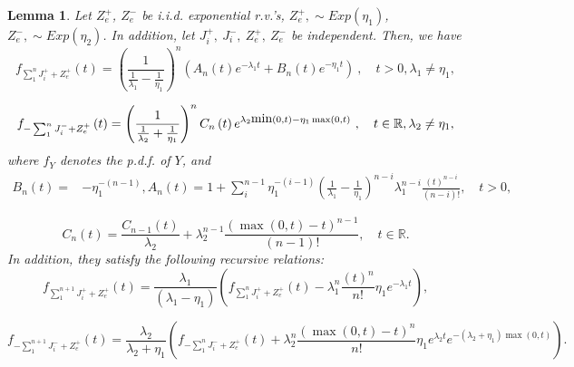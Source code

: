 \documentclass[11pt]{article}
\newtheorem{lemma}[theorem]{Lemma}
\numberwithin{equation}{section}
\numberwithin{theorem}{section}
\def\R{\mathbb{R}}
\begin{document}
\begin{lemma}
Let $Z_{e}^{+}$, $Z_{e}^{-}$ be i.i.d. exponential r.v.'s, $Z_{e}^{+},\sim Exp(\eta_{1})$,
$Z_{e}^{-},\sim Exp(\eta_{2})$. In addition, let $J_{i}^{+},\ J_{i}^{-},\ Z_{e}^{+},\ Z_{e}^{-}$
be independent. Then,  we have
\begin{equation}
f_{\sum_{1}^{n}J_{i}^{+}+Z_{e}^{+}}\left(t\right)=\left(\frac{1}{\frac{1}{\lambda_{1}}-\frac{1}{\eta_{1}}}\right)^{n}\left(A_{n}\left(t\right)e^{-\lambda_{1}t}+B_{n}\left(t\right)e^{-\eta_{1}t}\right)\ ,\quad t>0,  \lambda_{1}\neq\eta_{1},\label{eq:f_++}
\end{equation}
 
\begin{equation}
f_{-\sum_{1}^{n}J_{i}^{-}+Z_{e}^{+}}\left(t\right)=\left(\frac{1}{\frac{1}{\lambda_{2}}+\frac{1}{\eta_{1}}}\right)^{n}C_{n}\left(t\right)e^{\lambda_{2}\hbox{min}\left(0,t\right)-\eta_{1}\max\left(0,t\right)}\ ,\quad t\in \R,  \lambda_{2}\neq\eta_{1},\label{eq:f_-+}
\end{equation}
 where $f_{Y}$ denotes the p.d.f.  of $Y$, and 
\begin{align*}
B_{n}\left(t\right)= & -\eta_{1}^{-\left(n-1\right)},A_{n}\left(t\right)=1+\sum_{i}^{n-1}\eta_{1}^{-\left(i-1\right)}\left(\frac{1}{\lambda_{1}}-\frac{1}{\eta_{1}}\right)^{n-i}\lambda_{1}^{n-i}\frac{\left(t\right)^{n-i}}{\left(n-i\right)!}, \quad t >0,
\end{align*}
  
\[
C_{n}\left(t\right)=\frac{C_{n-1}\left(t\right)}{\lambda_{2}}+\lambda_{2}^{n-1}\frac{\left({\max}\left(0,t\right)-t\right)^{n-1}}{(n-1)!}, \quad t\in \R.
\]
 In addition, they  satisfy the following recursive relations: 
\begin{equation}
f_{\sum_{1}^{n+1}J_{i}^{+}+Z_{e}^{+}}\left(t\right)=\frac{\lambda_{1}}{\left(\lambda_{1}-\eta_{1}\right)}\left(f_{\sum_{1}^{n}J_{i}^{+}+Z_{e}^{+}}\left(t\right)-\lambda_{1}^{n}\frac{\left(t\right)^{n}}{n!}\eta_{1}e^{-\lambda_{1}t}\right) ,\label{eq:frec_++}
\end{equation}
 
\begin{equation}
f_{-\sum_{1}^{n+1}J_{i}^{-}+Z_{e}^{+}}\left(t\right)=\frac{\lambda_{2}}{\lambda_{2}+\eta_{1}}\left(f_{-\sum_{1}^{n}J_{i}^{-}+Z_{e}^{+}}\left(t\right)+\lambda_{2}^{n}\frac{\left(\max\left(0,t\right)-t\right)^{n}}{n!}\eta_{1}e^{\lambda_{2}t}e^{-\left(\lambda_{2}+\eta_{1}\right)\max\left(0,t\right)}\right).\label{eq:frec_-+}
\end{equation}
\end{lemma}
\end{document}
